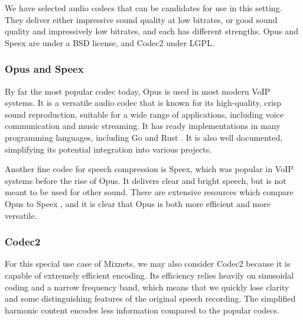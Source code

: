 \documentclass{article}
\begin{document}
We have selected audio codecs that can be candidates for use in this setting. They deliver either impressive sound quality at low bitrates, or good sound quality and impressively low bitrates, and each has different strengths. Opus and Speex are under a BSD license, and Codec2 under LGPL.


\subsubsection*{Opus and Speex}

By far the most popular codec today, Opus is used in most modern VoIP systems. It is a versatile audio codec that is known for its high-quality, crisp sound reproduction, suitable for a wide range of applications, including voice communication and music streaming. It has ready implementations in many programming languages, including Go \cite{pion} and Rust \cite{symphonia}. It is also well documented, simplifying its potential integration into various projects. \cite{opusdoc}

Another fine codec for speech compression is Speex, which was popular in VoIP systems before the rise of Opus. It delivers clear and bright speech, but is not meant to be used for other sound. There are extensive resources which compare Opus to Speex \cite{opuscomp} \cite{opuscomp2}, and it is clear that Opus is both more efficient and more versatile.
\subsubsection*{Codec2}

For this special use case of Mixnets, we may also consider Codec2 because it is capable of extremely efficient encoding. Its efficiency relies heavily on sinusoidal coding and a narrow frequency band, which means that we quickly lose clarity and some distinguishing features of the original speech recording. The simplified harmonic content encodes less information compared to the popular codecs. 
\end{document}
